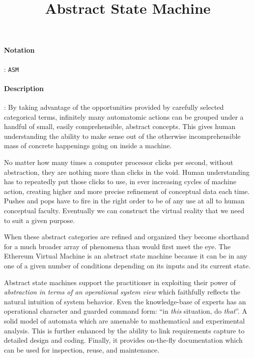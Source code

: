 \documentclass[10pt,a4paper,oneside]{scrartcl}
\title{Abstract State Machine}
\date{}
\begin{document}
\maketitle
\paragraph{Notation}: \texttt{ASM}
\paragraph{Description}: By taking advantage of the opportunities provided by carefully selected categorical terms, infinitely many automatomic actions can be grouped under a handful of small, easily comprehensible, abstract concepts. This gives human understanding the ability to make sense out of the otherwise incomprehensible mass of concrete happenings going on inside a machine. 

No matter how many times a computer processor clicks per second, without abstraction, they are nothing more than clicks in the void. Human understanding has to repeatedly put those clicks to use, in ever increasing cycles of machine action, creating higher and more precise refinement of conceptual data each time. Pushes and pops have to fire in the right order to be of any use at all to human conceptual faculty. Eventually we can construct the virtual reality that we need to suit a given purpose.

When these abstract categories are refined and organized they become shorthand for a much broader array of phenomena than would first meet the eye. The Ethereum Virtual Machine is an abstract state machine because it can be in any one of a given number of conditions depending on its inputs and its current state.



Abstract state machines support the practitioner in exploiting their power of \textsl{abstraction in terms of an operational system view} which faithfully reflects the natural intuition of system behavior. Even the knowledge-base of experts has an operational character and guarded command form: ``in \textit{this} situation, do \textit{that}''. A solid model of automata which are amenable to mathematical and experimental analysis. This is further enhanced by the ability to link requirements capture to detailed design and coding. Finally, it provides on-the-fly documentation which can be used for inspection, reuse, and maintenance.
\par 
\end{document}
